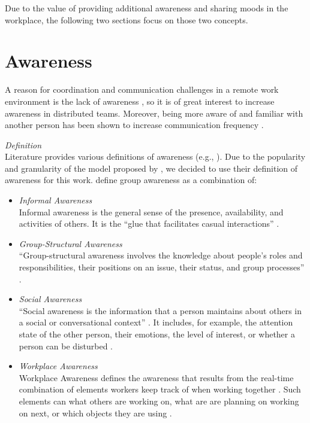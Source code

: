 Due to the value of providing additional awareness and sharing moods in the workplace, the following two sections focus on those two concepts.

\section{Awareness}
\label{section:awareness}
A reason for coordination and communication challenges in a remote work environment is the lack of awareness \autocite{herbsleb2007global, gutwin2004group}, so it is of great interest to increase awareness in distributed teams. Moreover, being more aware of and familiar with another person has been shown to increase communication frequency \autocite{chang2007out}.

\medskip\noindent\textit{Definition} \\
Literature provides various definitions of awareness (e.g., \autocite{chang2007out, gross2013supporting, gross2005user}). Due to the popularity and granularity of the model proposed by \textcite{gutwin1996workspace}, we decided to use their definition of awareness for this work. \textcite{gutwin1996workspace} define group awareness as a combination of:


\begin{itemize}[itemsep=0ex, parsep=1ex, leftmargin=*]
      \item \textit{Informal Awareness} \\
            Informal awareness is the general sense of the presence, availability, and activities of others. It is the \enquote{glue that facilitates casual interactions} \autocite[p.~6]{gutwin1996workspace}.
      \item \textit{Group-Structural Awareness} \\
            \enquote{Group-structural awareness involves the knowledge about people’s roles and responsibilities, their positions on an issue, their status, and group processes} \autocite[p.~6]{gutwin1996workspace}.
      \item \textit{Social Awareness} \\
            \enquote{Social awareness is the information that a person maintains about others in a social or conversational context} \autocite[p.~6]{gutwin1996workspace}. It includes, for example, the attention state of the other person, their emotions, the level of interest, or whether a person can be disturbed \autocite{gutwin1995support}.
      \item \textit{Workplace Awareness} \\
            Workplace Awareness defines the awareness that results from the real-time combination of elements workers keep track of when working together \autocite{gutwin1996workspace}. Such elements can what others are working on, what are are planning on working on next, or which objects they are using \autocite{gutwin1996workspace}.
\end{itemize}

